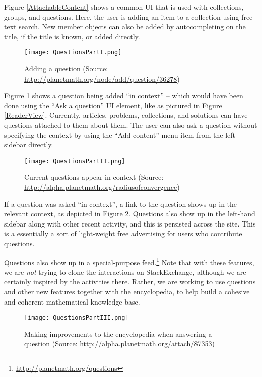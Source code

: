 \documentclass[12pt]{article}
\begin{document}
Figure \ref{AttachableContent} shows a common UI that is used with collections, groups, and questions.  Here, the user is adding an item to a collection using free-text search.  New member objects can also be added by autocompleting on the title, if the title is known, or added directly.

\begin{figure}[h]
\begin{center}
\texttt{[image: QuestionsPartI.png]}
\end{center}
\caption{Adding a question (Source: \url{http://planetmath.org/node/add/question/36278}) \label{QuestionsPartI}}
\end{figure}

Figure \ref{QuestionsPartI} shows a question being added ``in context'' -- which would have been done using the ``Ask a question'' UI element, like as pictured in Figure \ref{ReaderView}.  Currently, articles, problems, collections, and solutions can have questions attached to them about them.  The user can also ask a question without specifying the context by using the ``Add content'' menu item from the left sidebar directly.

\begin{figure}[h]
\begin{center}
\texttt{[image: QuestionsPartII.png]}
\end{center}
\caption{Current questions appear in context (Source: \url{http://alpha.planetmath.org/radiusofconvergence})\label{QuestionsPartII}}
\end{figure}

If a question was asked ``in context'', a link to the question shows up in the relevant context, as depicted in Figure \ref{QuestionsPartII}.  Questions also show up in the left-hand sidebar along with other recent activity, and this is persisted across the site.  This is a essentially a sort of light-weight free advertising for users who contribute questions.

Questions also show up in a special-purpose feed.\footnote{\url{http://planetmath.org/questions}} Note that with these features, we are \emph{not} trying to clone the interactions on StackExchange, although we are certainly inspired by the activities there.  Rather, we are working to use questions and other new features together with the encyclopedia, to help build a cohesive and coherent mathematical knowledge base.

\begin{figure}[h]
\begin{center}
\texttt{[image: QuestionsPartIII.png]}
\end{center}
\caption{Making improvements to the encyclopedia when answering a question (Source: \url{http://alpha.planetmath.org/attach/87353}) \label{QuestionsPartIII}}
\end{figure}
\end{document}
